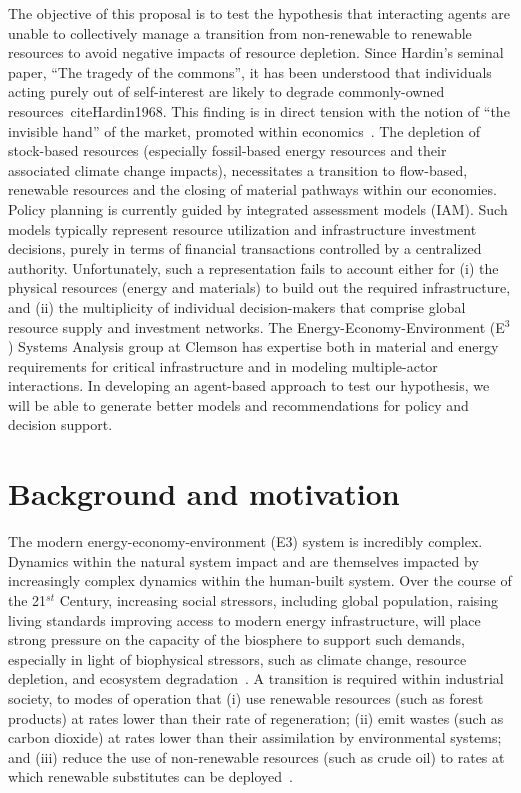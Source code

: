 \documentclass[11pt,a4paper]{article}
\begin{document}
The objective of this proposal is to test the hypothesis that 
interacting agents are unable to collectively manage 
a transition from non-renewable to renewable resources 
to avoid negative impacts of resource depletion. 
Since Hardin's seminal paper, ``The tragedy of the commons'',
it has been understood that individuals acting purely out of self-interest
are likely to degrade commonly-owned resources~cite{Hardin1968}.
This finding is in direct tension with the notion of
``the invisible hand'' of the market,
promoted within economics~\cite{Smith1776}.
The depletion of stock-based resources
(especially fossil-based energy resources
and their associated climate change impacts),
necessitates a transition to flow-based, renewable resources
and the closing of material pathways within our economies.
Policy planning is currently guided by integrated assessment models (IAM).
Such models typically represent resource utilization and infrastructure investment decisions,
purely in terms of financial transactions controlled by a centralized authority.
Unfortunately, such a representation fails to account either for
(i) the physical resources (energy and materials) 
to build out the required infrastructure, and
(ii) the multiplicity of individual decision-makers that comprise 
global resource supply and investment networks.
The Energy-Economy-Environment (E$^3$) Systems Analysis group
at Clemson has expertise both in 
material and energy requirements for critical infrastructure 
and in modeling multiple-actor interactions.
In developing an agent-based approach to test our hypothesis,
we will be able to generate better models and recommendations 
for policy and decision support.



\section{Background and motivation}
\label{sec:back}

The modern energy-economy-environment (E3) system is incredibly complex.
Dynamics within the natural system impact and are themselves impacted by
increasingly complex dynamics within the human-built system.
Over the course of the 21$^{st}$ Century, 
increasing social stressors, including
global population,
raising living standards
improving access to modern energy infrastructure,
will place strong pressure on the capacity of the biosphere
to support such demands,
especially in light of biophysical stressors,
such as climate change,
resource depletion, and
ecosystem degradation~\cite{IPCC2014}.
A transition is required within industrial society,
to modes of operation that
(i) use renewable resources (such as forest products) 
at rates lower than their rate of regeneration;
(ii) emit wastes (such as carbon dioxide) 
at rates lower than their assimilation by environmental systems; and
(iii) reduce the use of non-renewable resources (such as crude oil) 
to rates at which renewable substitutes can be deployed~\cite{Goodland1996, G-R1971}.
\end{document}
